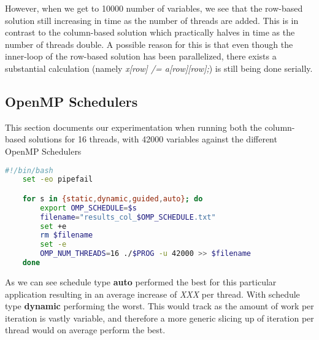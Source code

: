     However, when we get to 10000 number of variables, we see that the row-based solution still increasing in time as the number of threads are added.
    This is in contrast to the column-based solution which practically halves in time as the number of threads double.
    A possible reason for this is that even though the inner-loop of the row-based solution has been parallelized, there exists a substantial calculation (namely \textit{x[row] /= a[row][row];})
    is still being done serially.

\subsection{OpenMP Schedulers}
  This section documents our experimentation when running both the column-based solutions for 16 threads, with 42000 variables against the different OpenMP Schedulers
  \begin{lstlisting}[language=bash]
    #!/bin/bash
    set -eo pipefail

    for s in {static,dynamic,guided,auto}; do
        export OMP_SCHEDULE=$s
        filename="results_col_$OMP_SCHEDULE.txt"
        set +e
        rm $filename
        set -e
        OMP_NUM_THREADS=16 ./$PROG -u 42000 >> $filename
    done
  \end{lstlisting}

  As we can see schedule type \textbf{auto} performed the best for this particular application resulting in an average increase of \textit{XXX} per thread. 
  With schedule type \textbf{dynamic} performing the worst. 
  This would track as the amount of work per iteration is vastly variable, and therefore a more generic slicing up of iteration per thread would on average perform the best.